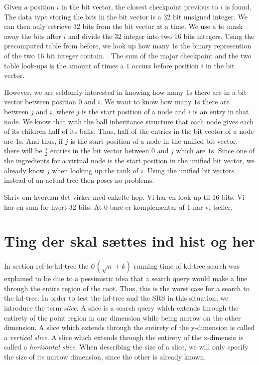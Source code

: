 Given a position $i$ in the bit vector, the closest checkpoint previous to $i$ is found. The data type storing the bits in the bit vector is a $32$ bit unsigned integer. We can then only retrieve $32$ bits from the bit vector at a time. We use a  to mask away the bits after $i$ and divide the $32$ integer into two $16$ bits integers. Using the precomputed table from before, we look up how many $1$s the binary represention of the two $16$ bit integer contain. . The sum of the major checkpoint and the two table look-ups is the amount of times a $1$ occurs before position $i$ in the bit vector. 

However, we are seldomly interested in knowing how many $1$s there are in a bit vector between position $0$ and $i$. We want to know how many $1$s there are between $j$ and $i$, where $j$ is the start position of a node and $i$ is an entry in that node. We know that with the ball inheritance structure that each node gives each of its children half of its balls. Thus, half of the entries in the bit vector of a node are $1$s. And thus, if $j$ is the start position of a node in the unified bit vector, there will be $\frac{j}{2}$ entries in the bit vector between $0$ and $j$ which are $1$s. Since one of the ingredients for a virtual node is the start position in the unified bit vector, we already know $j$ when looking up the rank of $i$. Using the unified bit vectors instead of an actual tree then poses no problems.


Skriv om hvordan det virker med enkelte hop. Vi har en look-up til 16 bits. Vi har en sum for hvert 32 bits. At 0 bare er komplementar af 1 når vi tæller.


\section{Ting der skal sættes ind hist og her}

In section ref-to-kd-tree the $\mathcal{O}(\sqrt{n}+k)$ running time of kd-tree search was explained to be due to a pessimistic idea that a search query would make a line through the entire region of the root. Thus, this is the worst case for a search to the kd-tree. In order to test the kd-tree and the SRS in this situation, we introduce the term \emph{slice}. A slice is a search query which extends through the entirety of the point region  in one dimension while being narrow on the other dimension. A slice which extends through the entirety of the y-dimension is called a \emph{vertical slice}. A slice which extends through the entirety of the x-dimensio is called a \emph{horizontal slice}. When describing the size of a slice, we will only specify the size of its narrow dimension, since the other is already known.

